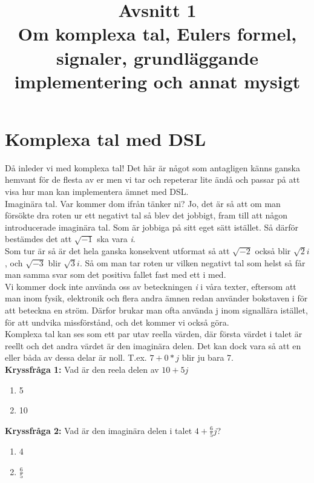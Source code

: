 \documentclass{article}
\title{Avsnitt 1 \\ 
\large Om komplexa tal, Eulers formel, signaler, grundläggande implementering och annat mysigt}
\author{ }
\date{}
\begin{document}
\maketitle

\section{Komplexa tal med DSL}
Då inleder vi med komplexa tal! Det här är något som antagligen känns ganska
hemvant för de flesta av er men vi tar och repeterar lite ändå och passar på
att visa hur man kan implementera ämnet med DSL. \\

Imaginära tal. Var kommer dom ifrån tänker ni? Jo, det är så att om man
försökte dra roten ur ett negativt tal så blev det jobbigt, fram till att
någon introducerade imaginära tal. Som är jobbiga på sitt eget sätt istället.
Så därför bestämdes det att $\sqrt{-1}$ ska vara \emph{i}. \\

Som tur är så är det hela ganska konsekvent utformat så att $\sqrt{-2}$ också blir $\sqrt{2}i$, och $\sqrt{-3}$ blir $\sqrt{3} i$. Så om man tar roten ur vilken negativt tal som helst så får man samma svar som det positiva fallet fast med ett i med. \\
\newline
Vi kommer dock inte använda oss av beteckningen \emph{i} i våra texter, eftersom att man inom fysik, elektronik och flera andra ämnen redan använder bokstaven i  för att beteckna en ström. Därfor brukar man ofta använda j inom signallära istället, för att undvika missförstånd, och det kommer vi också göra. \\
\newline
Komplexa tal kan ses som ett par utav reella värden, där första
värdet i talet är reellt och det andra värdet är den imaginära
delen. Det kan dock vara så att en eller båda av dessa delar är noll. 
T.ex. $7+0*j$ blir ju bara 7. \\ 
\newline
\textbf{Kryssfråga 1:} Vad är den reela delen av $10 + 5 j$
\begin{enumerate}[label={\alph*)},font={\bfseries}]
\item 5
\item 10
\end{enumerate}
\textbf{Kryssfråga 2:} Vad är den imaginära delen i talet $4 + \frac{6}{5}j$?
\begin{enumerate}[label={\alph*)},font={\bfseries}]
\item 4
\item $\frac{6}{5}$
\end{enumerate}
\end{document}
